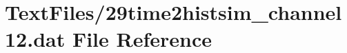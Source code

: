\hypertarget{29time2histsim__channel12_8dat}{}\section{Text\+Files/29time2histsim\+\_\+channel12.dat File Reference}
\label{29time2histsim__channel12_8dat}
